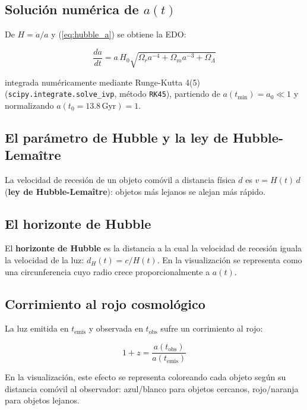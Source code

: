 \documentclass[12pt, a4paper]{article}
\begin{document}
\subsection{Solución numérica de $a(t)$}

De $H = \dot a/a$ y (\ref{eq:hubble_a}) se obtiene la EDO:

\begin{equation}
  \frac{da}{dt} = a\, H_0\sqrt{\Omega_r a^{-4} + \Omega_m a^{-3} + \Omega_\Lambda}
  \label{eq:edo_a}
\end{equation}

integrada numéricamente mediante Runge-Kutta 4(5)
(\texttt{scipy.integrate.solve\_ivp}, método \texttt{RK45}), partiendo
de $a(t_{\min}) = a_0 \ll 1$ y normalizando $a(t_0=13.8\,\text{Gyr})=1$.

\subsection{El parámetro de Hubble y la ley de Hubble-Lemaître}

La velocidad de recesión de un objeto comóvil a distancia física $d$
es $v = H(t)\,d$ (\textbf{ley de Hubble-Lemaître}): objetos más
lejanos se alejan más rápido.

\subsection{El horizonte de Hubble}

El \textbf{horizonte de Hubble} es la distancia a la cual la velocidad
de recesión iguala la velocidad de la luz: $d_H(t) = c/H(t)$. En la
visualización se representa como una circunferencia cuyo radio crece
proporcionalmente a $a(t)$.

\subsection{Corrimiento al rojo cosmológico}

La luz emitida en $t_{\text{emis}}$ y observada en $t_{\text{obs}}$
sufre un corrimiento al rojo:

\begin{equation}
  1+z = \frac{a(t_{\text{obs}})}{a(t_{\text{emis}})}
  \label{eq:redshift}
\end{equation}

En la visualización, este efecto se representa coloreando cada objeto
según su distancia comóvil al observador: azul/blanco para objetos
cercanos, rojo/naranja para objetos lejanos.
\end{document}
